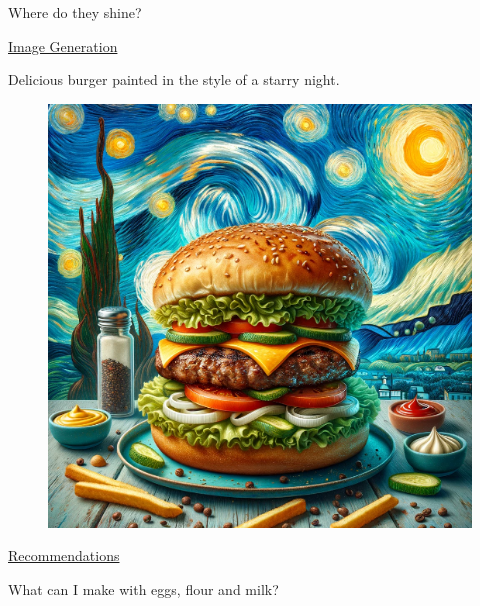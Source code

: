 \documentclass[final]{beamer}
\newlength{\colwidth}
\begin{document}
\begin{frame}{}
\begin{columns}[t]
\begin{column}{\colwidth}
    \begin{myblock}{Where do they shine?}
    \begin{minipage}[t]{0.49\textwidth}
        \begin{center}
            \underline{Image Generation}
        \end{center}
        \begin{tcolorbox}[colback=blockcolor]
            Delicious burger painted in the style of a starry night.
        \end{tcolorbox}
        \vspace{-1.1cm}
        \begin{tcolorbox}[colback=blockcolor]
        \begin{figure}
            \includegraphics[width=\textwidth,height=0.8\textwidth]{Images/Burger.png}
        \end{figure}
        \end{tcolorbox}
    \end{minipage}
    \hfill%
    \begin{minipage}[t]{0.49\textwidth}
        \begin{center}
            \underline{Recommendations}
        \end{center}
        \begin{tcolorbox}[colback=blockcolor]
            What can I make with eggs, flour and milk?
        \end{tcolorbox}
        \vspace{-1.1cm}
        \begin{tcolorbox}[colback=blockcolor]

\end{tcolorbox}
\end{minipage}
\end{myblock}
\end{column}
\end{columns}
\end{frame}
\end{document}
